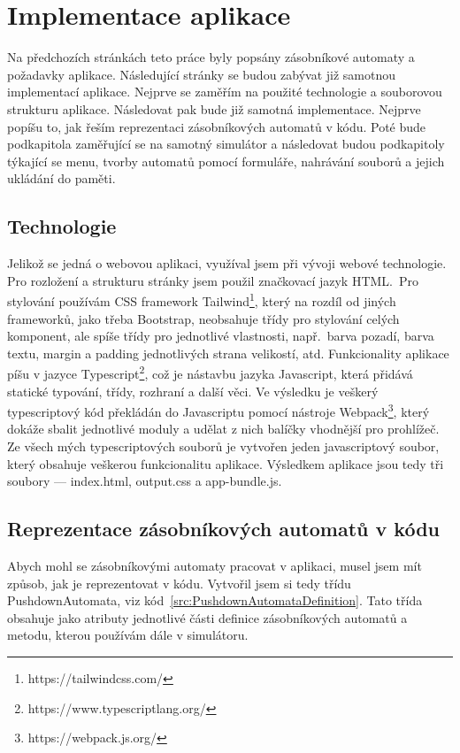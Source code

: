 \chapter{Implementace aplikace}\label{chap:AppImplemetation}

Na předchozích stránkách teto práce byly popsány zásobníkové automaty a požadavky aplikace. Následující stránky se budou zabývat již samotnou implementací aplikace. Nejprve se zaměřím na použité technologie a souborovou strukturu aplikace. Následovat pak bude již samotná implementace. Nejprve popíšu to, jak řeším reprezentaci zásobníkových automatů v kódu. Poté bude podkapitola zaměřující se na samotný simulátor a následovat budou podkapitoly týkající se menu, tvorby automatů pomocí formuláře, nahrávání souborů a jejich ukládání do paměti.

\section{Technologie}

Jelikož se jedná o webovou aplikaci, využíval jsem při vývoji webové technologie. Pro rozložení a strukturu stránky jsem použil značkovací jazyk HTML.\ Pro stylování používám CSS framework Tailwind\footnote{https://tailwindcss.com/}, který na rozdíl od jiných frameworků, jako třeba Bootstrap, neobsahuje třídy pro stylování celých komponent, ale spíše třídy pro jednotlivé vlastnosti, např.~barva pozadí, barva textu, margin a padding jednotlivých strana velikostí, atd. Funkcionality aplikace píšu v jazyce Typescript\footnote{https://www.typescriptlang.org/}, což je nástavbu jazyka Javascript, která přidává statické typování, třídy, rozhraní a další věci. Ve výsledku je veškerý typescriptový kód překládán do Javascriptu pomocí nástroje Webpack\footnote{https://webpack.js.org/}, který dokáže sbalit jednotlivé moduly a udělat z nich balíčky vhodnější pro prohlížeč. Ze všech mých typescriptových souborů je vytvořen jeden javascriptový soubor, který obsahuje veškerou funkcionalitu aplikace. Výsledkem aplikace jsou tedy tři soubory --- index.html, output.css a app-bundle.js.

\section{Reprezentace zásobníkových automatů v kódu}

Abych mohl se zásobníkovými automaty pracovat v aplikaci, musel jsem mít způsob, jak je reprezentovat v kódu. Vytvořil jsem si tedy třídu PushdownAutomata, viz kód~\ref{src:PushdownAutomataDefinition}. Tato třída obsahuje jako atributy jednotlivé části definice zásobníkových automatů a metodu, kterou používám dále v simulátoru.

